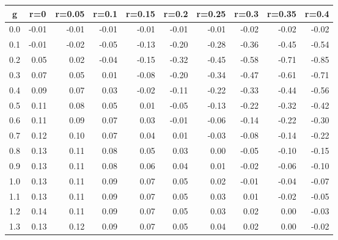 %
\begin{table}[!tbp]
 \begin{center}
 \begin{tabular}{rrrrrrrrrr}\hline\hline
\multicolumn{1}{c}{g}&\multicolumn{1}{c}{r=0}&\multicolumn{1}{c}{r=0.05}&\multicolumn{1}{c}{r=0.1}&\multicolumn{1}{c}{r=0.15}&\multicolumn{1}{c}{r=0.2}&\multicolumn{1}{c}{r=0.25}&\multicolumn{1}{c}{r=0.3}&\multicolumn{1}{c}{r=0.35}&\multicolumn{1}{c}{r=0.4}\tabularnewline
\hline
0.0&-0.01&-0.01&-0.01&-0.01&-0.01&-0.01&-0.02&-0.02&-0.02\tabularnewline
0.1&-0.01&-0.02&-0.05&-0.13&-0.20&-0.28&-0.36&-0.45&-0.54\tabularnewline
0.2& 0.05& 0.02&-0.04&-0.15&-0.32&-0.45&-0.58&-0.71&-0.85\tabularnewline
0.3& 0.07& 0.05& 0.01&-0.08&-0.20&-0.34&-0.47&-0.61&-0.71\tabularnewline
0.4& 0.09& 0.07& 0.03&-0.02&-0.11&-0.22&-0.33&-0.44&-0.56\tabularnewline
0.5& 0.11& 0.08& 0.05& 0.01&-0.05&-0.13&-0.22&-0.32&-0.42\tabularnewline
0.6& 0.11& 0.09& 0.07& 0.03&-0.01&-0.06&-0.14&-0.22&-0.30\tabularnewline
0.7& 0.12& 0.10& 0.07& 0.04& 0.01&-0.03&-0.08&-0.14&-0.22\tabularnewline
0.8& 0.13& 0.11& 0.08& 0.05& 0.03& 0.00&-0.05&-0.10&-0.15\tabularnewline
0.9& 0.13& 0.11& 0.08& 0.06& 0.04& 0.01&-0.02&-0.06&-0.10\tabularnewline
1.0& 0.13& 0.11& 0.09& 0.07& 0.05& 0.02&-0.01&-0.04&-0.07\tabularnewline
1.1& 0.13& 0.11& 0.09& 0.07& 0.05& 0.03& 0.01&-0.02&-0.05\tabularnewline
1.2& 0.14& 0.11& 0.09& 0.07& 0.05& 0.03& 0.02& 0.00&-0.03\tabularnewline
1.3& 0.13& 0.12& 0.09& 0.07& 0.05& 0.04& 0.02& 0.00&-0.02\tabularnewline
\hline
\end{tabular}

\end{center}

\end{table}

